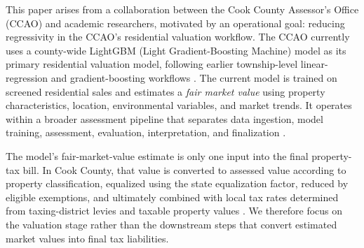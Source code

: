 \documentclass[10pt]{article}
\theoremstyle{definition}
\newcommand{\1}{\mathbf{1}}
\begin{document}
This paper arises from a collaboration between the Cook County Assessor's Office (CCAO) and academic researchers, motivated by an operational goal: reducing regressivity in the CCAO's residential valuation workflow. The CCAO currently uses a county-wide LightGBM (Light Gradient-Boosting Machine) model \cite{lightgbm} as its primary residential valuation model, {following earlier township-level linear-regression and gradient-boosting workflows} \cite{CCAOModelResAVM2026}. The current model is trained on screened residential sales and estimates a \emph{fair market value} using property characteristics, location, environmental variables, and market trends. It operates within a broader assessment pipeline that separates data ingestion, model training, assessment, evaluation, interpretation, and finalization \cite{CCAOModelResAVM2026}.


{The model's fair-market-value estimate is only one input into the final property-tax bill. In Cook County, that value is converted to assessed value according to property classification, equalized using the state equalization factor, reduced by eligible exemptions, and ultimately combined with local tax rates determined from taxing-district levies and taxable property values \cite{CCAOAssessmentNotice2026,CCAOPropertyTaxSystem2026}. We therefore focus on the valuation stage rather than the downstream steps that convert estimated market values into final tax liabilities.}
\end{document}
